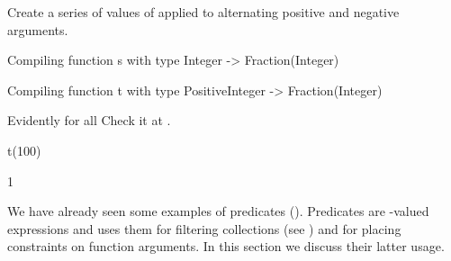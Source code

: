 \begin{xtc}
\begin{xtccomment}
Create a series of values of  applied to
alternating positive and negative arguments.
\end{xtccomment}
\begin{spadsrc}
[t(i) for i in 1..]
\end{spadsrc}
\begin{MessageOutput}
   Compiling function s with type Integer -> Fraction(Integer) 
\end{MessageOutput}
\begin{MessageOutput}
   Compiling function t with type PositiveInteger -> Fraction(Integer) 
\end{MessageOutput}
\begin{TeXOutput}
\begin{fricasmath}{10}
%
\end{fricasmath}
\end{TeXOutput}
\end{xtc}
\begin{xtc}
\begin{xtccomment}
Evidently  for all 
Check it at .
\end{xtccomment}
\begin{spadsrc}
t(100)
\end{spadsrc}
\begin{TeXOutput}
\begin{fricasmath}{11}
1%
\end{fricasmath}
\end{TeXOutput}
\end{xtc}


We have already seen some examples of
predicates
().
Predicates are -valued expressions and \Language{} uses them
for filtering collections
(see )
and for placing
constraints on function arguments.
In this section we discuss their latter usage.

